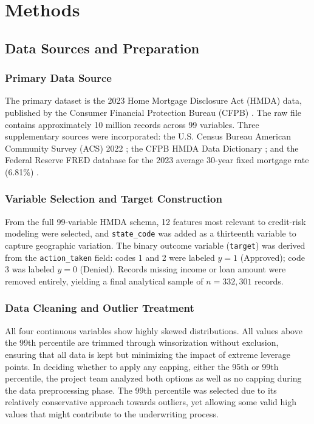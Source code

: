 \documentclass[12pt,letterpaper]{article}
\begin{document}
\section{Methods}

\subsection{Data Sources and Preparation}

\subsubsection{Primary Data Source}

The primary dataset is the 2023 Home Mortgage Disclosure Act (HMDA) data, published by the
Consumer Financial Protection Bureau (CFPB) \citep{cfpb2023}. The raw file contains
approximately 10 million records across 99 variables. Three supplementary sources were
incorporated: the U.S. Census Bureau American Community Survey (ACS) 2022 \citep{census2022};
the CFPB HMDA Data Dictionary \citep{cfpb_dict}; and the Federal Reserve FRED database for the
2023 average 30-year fixed mortgage rate (6.81\%) \citep{fred2023}.

\subsubsection{Variable Selection and Target Construction}

From the full 99-variable HMDA schema, 12 features most relevant to credit-risk modeling were
selected, and \texttt{state\_code} was added as a thirteenth variable to capture geographic
variation. The binary outcome variable (\texttt{target}) was derived from the
\texttt{action\_taken} field: codes 1 and 2 were labeled $y=1$ (Approved); code 3 was labeled
$y=0$ (Denied). Records missing income or loan amount were removed entirely, yielding a final
analytical sample of $n = 332{,}301$ records.

\subsubsection{Data Cleaning and Outlier Treatment}

All four continuous variables show highly skewed distributions. All values above the 99th percentile are trimmed through winsorization without exclusion, ensuring that all data is kept but minimizing the impact of extreme leverage points. In deciding whether to apply any capping, either the 95th or 99th percentile, the project team analyzed both options as well as no capping during the data preprocessing phase. The 99th percentile was selected due to its relatively conservative approach towards outliers, yet allowing some valid high values that might contribute to the underwriting process.
\end{document}
